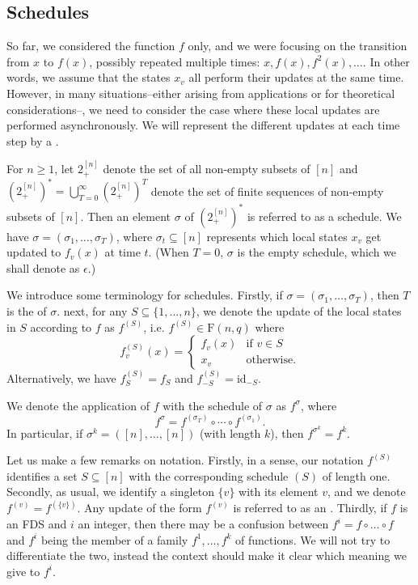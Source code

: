 \documentclass[a4paper, 11pt]{book}
\numberwithin{equation}{section}
\theoremstyle{plain}
\newcommand{\functions}{\mathrm{F}}
\newcommand{\id}{\mathrm{id}}
\renewcommand{\(}{\ldbrack}
\renewcommand{\)}{\rdbrack}
\newcommand{\BF}[1]{{\bf\boldmath{#1}\unboldmath}}
\begin{document}
\subsection{Schedules} \label{sec:schedules}

So far, we considered the function $f$ only, and we were focusing on the transition from $x$ to $f(x)$, possibly repeated multiple times: $x, f(x), f^2(x), \dots$. In other words, we assume that the states $x_v$ all perform their updates at the same time. However, in many situations--either arising from applications or for theoretical considerations--, we need to consider the case where these local updates are performed asynchronously. We will represent the different updates at each time step by a \BF{schedule}. 

For $n \ge 1$, let $2_+^{[n]}$ denote the set of all non-empty subsets of $[n]$ and $(2_+^{[n]})^* = \bigcup_{T=0}^\infty (2_+^{[n]})^T$ denote the set of finite sequences of non-empty subsets of $[n]$. Then an element $\sigma$ of $(2_+^{[n]})^*$ is referred to as a schedule. We have $\sigma = (\sigma_1, \dots, \sigma_T)$, where $\sigma_t \subseteq [n]$ represents which local states $x_v$ get updated to $f_v(x)$ at time $t$. (When $T=0$, $\sigma$ is the empty schedule, which we shall denote as $\epsilon$.)

We introduce some terminology for schedules. Firstly, if $\sigma = (\sigma_1, \dots, \sigma_T)$, then $T$ is the \BF{length} \label{schedule!length of a} of $\sigma$. next, for any $S \subseteq \{1, \dots, n\}$, we denote the update of the local states in $S$ according to $f$ as $f^{(S)}$, i.e. $f^{(S)} \in \functions(n,q)$ where
\[
	f^{(S)}_v(x) = \begin{cases}
		f_v(x) &\text{if } v \in S\\
		x_v &\text{otherwise}.
	\end{cases}
\]
Alternatively, we have $f^{(S)}_S = f_S$ and $f^{(S)}_{- S} = \id_{- S}$. 

We denote the application of $f$ with the schedule of $\sigma$ as $f^\sigma$, where
\[
	f^\sigma = f^{(\sigma_T)} \circ \cdots \circ f^{(\sigma_1)}.
\]
In particular, if $\sigma^k = ([n], \dots, [n])$ (with length $k$), then $f^{\sigma^k} = f^k$.

Let us make a few remarks on notation. Firstly, in a sense, our notation $f^{(S)}$ identifies a set $S \subseteq [n]$ with the corresponding schedule $(S)$ of length one. Secondly, as usual, we identify a singleton $\{v\}$ with its element $v$, and we denote $f^{(v)} = f^{(\{v\})}$. Any update of the form $f^{(v)}$ is referred to as an \BF{instruction}. Thirdly, if $f$ is an FDS and $i$ an integer, then there may be a confusion between $f^i = f \circ \dots \circ f$ and $f^i$ being the member of a family $f^1, \dots, f^k$ of functions. We will not try to differentiate the two, instead the context should make it clear which meaning we give to $f^i$.
\end{document}
